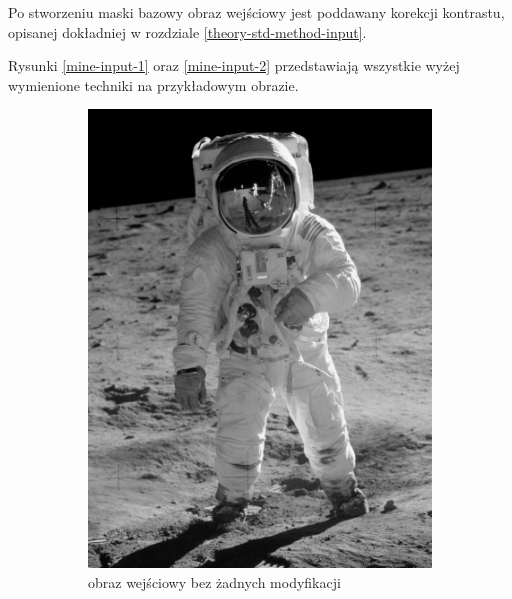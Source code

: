     Po stworzeniu maski bazowy obraz wejściowy jest poddawany korekcji kontrastu, opisanej dokładniej w rozdziale \ref{theory-std-method-input}.
    
    Rysunki \ref{mine-input-1} oraz \ref{mine-input-2} przedstawiają wszystkie wyżej wymienione techniki na przykładowym obrazie.
    \begin{figure}[H] 
        \centering
        \begin{subfigure}{0.49\textwidth}
            \centering
            \includegraphics[width = \textwidth]{img/4-mine/input-input.png}
            \caption{obraz wejściowy bez żadnych modyfikacji}
            \label{mine-input-1-a}
        \end{subfigure}
        \begin{subfigure}{0.49\textwidth}
            \centering

\end{subfigure}
\end{figure}
